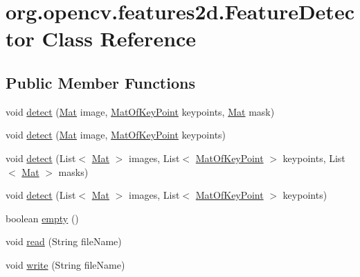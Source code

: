 \hypertarget{classorg_1_1opencv_1_1features2d_1_1_feature_detector}{}\section{org.\+opencv.\+features2d.\+Feature\+Detector Class Reference}
\label{classorg_1_1opencv_1_1features2d_1_1_feature_detector}
\subsection*{Public Member Functions}
\begin{DoxyCompactItemize}
\item 
void \mbox{\hyperlink{classorg_1_1opencv_1_1features2d_1_1_feature_detector_a0682aacc52f2a50b80ba5d439acc6aef}{detect}} (\mbox{\hyperlink{classorg_1_1opencv_1_1core_1_1_mat}{Mat}} image, \mbox{\hyperlink{classorg_1_1opencv_1_1core_1_1_mat_of_key_point}{Mat\+Of\+Key\+Point}} keypoints, \mbox{\hyperlink{classorg_1_1opencv_1_1core_1_1_mat}{Mat}} mask)
\item 
void \mbox{\hyperlink{classorg_1_1opencv_1_1features2d_1_1_feature_detector_ad86c751e11de7193dd1215421e56c901}{detect}} (\mbox{\hyperlink{classorg_1_1opencv_1_1core_1_1_mat}{Mat}} image, \mbox{\hyperlink{classorg_1_1opencv_1_1core_1_1_mat_of_key_point}{Mat\+Of\+Key\+Point}} keypoints)
\item 
void \mbox{\hyperlink{classorg_1_1opencv_1_1features2d_1_1_feature_detector_a2d08427ba77652f525490016e7ee5419}{detect}} (List$<$ \mbox{\hyperlink{classorg_1_1opencv_1_1core_1_1_mat}{Mat}} $>$ images, List$<$ \mbox{\hyperlink{classorg_1_1opencv_1_1core_1_1_mat_of_key_point}{Mat\+Of\+Key\+Point}} $>$ keypoints, List$<$ \mbox{\hyperlink{classorg_1_1opencv_1_1core_1_1_mat}{Mat}} $>$ masks)
\item 
void \mbox{\hyperlink{classorg_1_1opencv_1_1features2d_1_1_feature_detector_a5fbed25fbb3c683ae67b1d4b737866a9}{detect}} (List$<$ \mbox{\hyperlink{classorg_1_1opencv_1_1core_1_1_mat}{Mat}} $>$ images, List$<$ \mbox{\hyperlink{classorg_1_1opencv_1_1core_1_1_mat_of_key_point}{Mat\+Of\+Key\+Point}} $>$ keypoints)
\item 
boolean \mbox{\hyperlink{classorg_1_1opencv_1_1features2d_1_1_feature_detector_ae6bf0d1c57cad788985a945b78cf5095}{empty}} ()
\item 
void \mbox{\hyperlink{classorg_1_1opencv_1_1features2d_1_1_feature_detector_a16df09d148858d3ee52a5de88172bae3}{read}} (String file\+Name)
\item 
void \mbox{\hyperlink{classorg_1_1opencv_1_1features2d_1_1_feature_detector_ab00d5084ee71b9f6ee7d5c1b41007321}{write}} (String file\+Name)
\end{DoxyCompactItemize}
